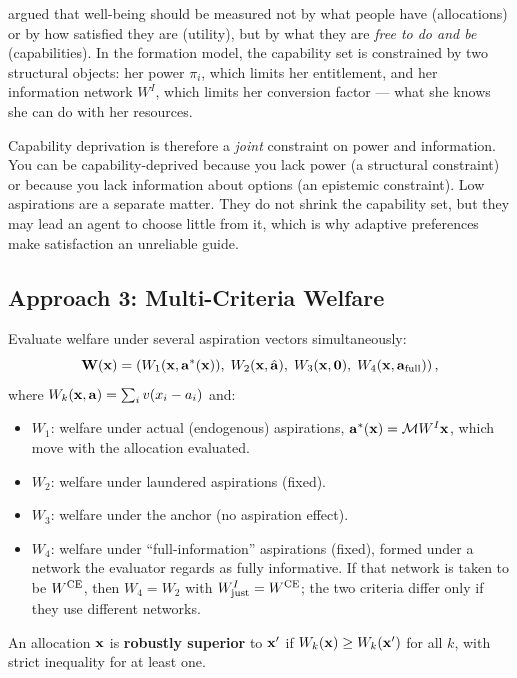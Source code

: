 \documentclass[../structural_economics_book.tex]{subfiles}
\begin{document}
\begin{intuition}
\citet{sen1999development} argued that well-being should be measured not by what people have (allocations) or by how satisfied they are (utility), but by what they are \textit{free to do and be} (capabilities). In the formation model, the capability set is constrained by two structural objects: her power $\pi_i$, which limits her entitlement, and her information network $W^I$, which limits her conversion factor --- what she knows she can do with her resources.

Capability deprivation is therefore a \textit{joint} constraint on power and information. You can be capability-deprived because you lack power (a structural constraint) or because you lack information about options (an epistemic constraint). Low aspirations are a separate matter. They do not shrink the capability set, but they may lead an agent to choose little from it, which is why adaptive preferences make satisfaction an unreliable guide.
\end{intuition}


\subsection{Approach 3: Multi-Criteria Welfare}

\begin{definition}\label{ch12:def:multi}
Evaluate welfare under several aspiration vectors simultaneously:
\begin{equation}\label{ch12:eq:multi}
\mathbf{W}(\mathbf{x}) = \left(W_1(\mathbf{x}, \mathbf{a}^*(\mathbf{x})),\; W_2(\mathbf{x}, \hat{\mathbf{a}}),\; W_3(\mathbf{x}, \mathbf{0}),\; W_4(\mathbf{x}, \mathbf{a}_{\text{full}})\right),
\end{equation}
where $W_k(\mathbf{x}, \mathbf{a}) = \sum_i v(x_i - a_i)$ and:
\begin{itemize}
\item $W_1$: welfare under actual (endogenous) aspirations, $\mathbf{a}^*(\mathbf{x}) = \mathcal{M}W^I\mathbf{x}$, which move with the allocation evaluated.
\item $W_2$: welfare under laundered aspirations (fixed).
\item $W_3$: welfare under the anchor (no aspiration effect).
\item $W_4$: welfare under ``full-information'' aspirations (fixed), formed under a network the evaluator regards as fully informative. If that network is taken to be $W^{\text{CE}}$, then $W_4 = W_2$ with $W^I_{\text{just}} = W^{\text{CE}}$; the two criteria differ only if they use different networks.
\end{itemize}
An allocation $\mathbf{x}$ is \textbf{robustly superior} to $\mathbf{x}'$ if $W_k(\mathbf{x}) \geq W_k(\mathbf{x}')$ for all $k$, with strict inequality for at least one.
\end{definition}
\end{document}
